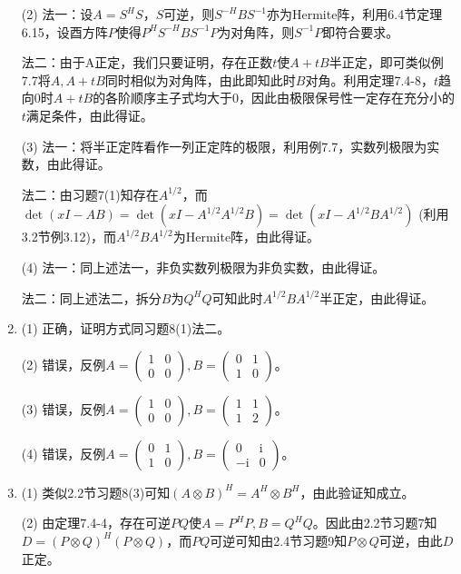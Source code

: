 \documentclass[a4paper,UTF8,fontset=windows]{ctexart}
\begin{document}
\begin{enumerate}
(2) 法一：设$A=S^HS$，$S$可逆，则$S^{-H}BS^{-1}$亦为Hermite阵，利用6.4节定理6.15，设酉方阵$P$使得$P^HS^{-H}BS^{-1}P$为对角阵，则$S^{-1}P$即符合要求。

法二：由于A正定，我们只要证明，存在正数$t$使$A+tB$半正定，即可类似例7.7将$A,A+tB$同时相似为对角阵，由此即知此时$B$对角。利用定理7.4-8，$t$趋向0时$A+tB$的各阶顺序主子式均大于0，因此由极限保号性一定存在充分小的$t$满足条件，由此得证。

(3) 法一：将半正定阵看作一列正定阵的极限，利用例7.7，实数列极限为实数，由此得证。

法二：由习题7(1)知存在$A^{1/2}$，而$\det(xI-AB)=\det(xI-A^{1/2}A^{1/2}B)=\det(xI-A^{1/2}BA^{1/2})$ (利用3.2节例3.12)，而$A^{1/2}BA^{1/2}$为Hermite阵，由此得证。

(4) 法一：同上述法一，非负实数列极限为非负实数，由此得证。

法二：同上述法二，拆分$B$为$Q^HQ$可知此时$A^{1/2}BA^{1/2}$半正定，由此得证。

\item
(1) 正确，证明方式同习题8(1)法二。

(2) 错误，反例$A=\begin{pmatrix}1&0\\0&0\end{pmatrix},B=\begin{pmatrix}0&1\\1&0\end{pmatrix}$。

(3) 错误，反例$A=\begin{pmatrix}1&0\\0&0\end{pmatrix},B=\begin{pmatrix}1&1\\1&2\end{pmatrix}$。

(4) 错误，反例$A=\begin{pmatrix}0&1\\1&0\end{pmatrix},B=\begin{pmatrix}0&\mathrm{i}\\-\mathrm{i}&0\end{pmatrix}$。

\item
(1) 类似2.2节习题8(3)可知$(A\otimes B)^H=A^H\otimes B^H$，由此验证知成立。

(2) 由定理7.4-4，存在可逆$PQ$使$A=P^HP,B=Q^HQ$。因此由2.2节习题7知$D=(P\otimes Q)^H(P\otimes Q)$，而$PQ$可逆可知由2.4节习题9知$P\otimes Q$可逆，由此$D$正定。


\end{enumerate}
\end{document}
